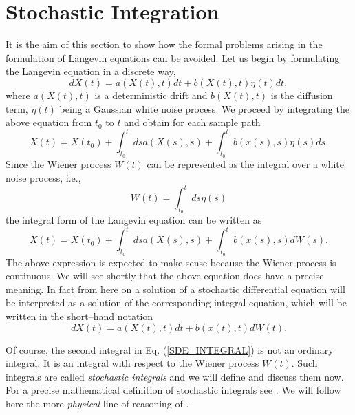\section{Stochastic Integration}
It is the aim of this section to show how the formal problems
arising in the formulation of Langevin equations can be avoided.
Let us begin by formulating the Langevin equation in a discrete 
way,
\begin{equation*}
dX(t) = a(X(t),t) dt + b(X(t),t) \eta(t) dt,
\end{equation*}
where $a(X(t),t)$ is a deterministic drift and $b(X(t),t)$ is the 
diffusion term, $\eta(t)$ being a Gaussian white noise process.
We proceed by integrating the above equation from $t_0$ to $t$
and obtain for each sample path
\begin{equation*}
X(t) = X(t_0) + \int_{t_0}^t ds a(X(s),s) 
+ \int_{t_0}^t b(x(s),s) \eta(s) ds.
\end{equation*}
Since the Wiener process $W(t)$ can be represented as the integral
over a white noise process, i.e.,
\begin{equation}
W(t) = \int_{t_0}^t ds \eta(s)
\end{equation}
the integral form of the Langevin equation can be written as
\begin{equation}
\label{SDE_INTEGRAL}
X(t) = X(t_0) + \int_{t_0}^t ds a(X(s),s) 
+ \int_{t_0}^t b(x(s),s) dW(s).
\end{equation}
The above expression is 
expected to make sense because the Wiener process is continuous. 
We will see shortly that the above 
equation does have a precise meaning. In fact
from here on a solution of a stochastic differential equation will be 
interpreted as a solution 
of the corresponding integral equation, which will be written
in the short--hand notation
\begin{equation*}
dX(t) =   a(X(t),t) dt + b(x(t),t) dW(t).
\end{equation*}

Of course, the second integral in Eq. (\ref{SDE_INTEGRAL}) is not 
an ordinary integral.  It is an integral with respect to the 
Wiener process $W(t)$. Such integrals are called {\em stochastic 
integrals} and we will define and discuss them now. For a precise
mathematical definition of stochastic integrals see \cite{GARD, 
POTTER,KLOEDEN_AN,OETTINGER}. We will follow here the more
{\em physical} line of reasoning of \cite{gardiner}.

